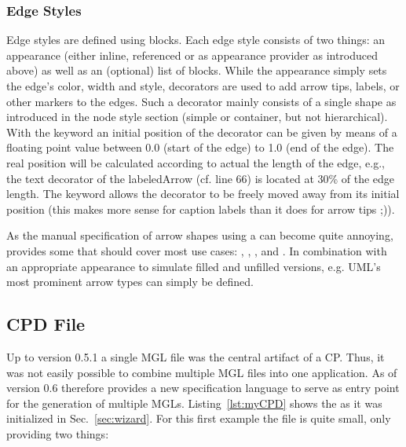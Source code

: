 \documentclass[a4paper,american,12pt]{scrreprt}
\begin{document}
\subsubsection{Edge Styles}

Edge styles are defined using   blocks. Each edge
style consists of two things: an appearance (either inline, referenced or as
appearance provider as introduced above) as well as an (optional) list of 
 blocks. While the appearance simply sets the edge's color, width
and style, decorators are used to add arrow tips, labels, or other markers to
the edges. Such a decorator mainly consists of a single shape as introduced in
the node style section (simple or container, but not hierarchical). With the
keyword  an initial position of the decorator can be given by means
of a floating point value between 0.0 (start of the edge) to 1.0 (end of the
edge). The real position will be calculated according to actual the length of
the edge, e.g., the text decorator of the labeledArrow (cf.
line 66) is located at 30\% of the edge length. The keyword  allows the decorator to be freely moved away
from its initial position (this makes more sense for caption labels than it does
for arrow tips ;)). 

As the manual specification of arrow shapes using a  can become
quite annoying, \cinco{} provides some  that
should cover most use cases: , , , and
. In combination with an appropriate appearance to simulate filled
and unfilled versions, e.g. UML's most prominent arrow types can simply be
defined.

\subsection{CPD File}
Up to \cinco version 0.5.1 a single MGL file was the central artifact of a CP. Thus,
it was not easily possible to combine multiple MGL files into one
application\footnotemark{}. As of version 0.6 \cinco therefore provides a new
%
%
%
specification language to serve as entry point for the generation of multiple
MGLs. Listing~\ref{lst:myCPD} shows the  as it was
initialized in Sec.~\ref{sec:wizard}. For this first example the file is
quite small, only providing two things:
\end{document}
